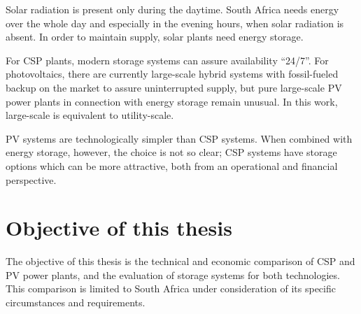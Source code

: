 Solar radiation is present only during the daytime. South Africa needs energy over the whole day and especially in the evening hours, when solar radiation is absent. In order to maintain supply, solar plants need energy storage. 


For \ac{CSP} plants, modern storage systems can assure availability \enquote{24/7}. For photovoltaics, there are currently large-scale hybrid systems with fossil-fueled backup on the market \cite{BELECTRIC2015} to assure uninterrupted supply, but pure large-scale \ac{PV} power plants in connection with energy storage remain unusual. In this work, large-scale is equivalent to utility-scale.


\ac{PV} systems are technologically simpler than \ac{CSP} systems. When combined with energy storage, however, the choice is not so clear; \ac{CSP} systems have storage options which can be more attractive, both from an operational and financial perspective.


\section{Objective of this thesis}

The objective of this thesis is the technical and economic comparison of \ac{CSP} and \ac{PV} power plants, and the evaluation of storage systems for both technologies. This comparison is limited to South Africa under consideration of its specific circumstances and requirements.

